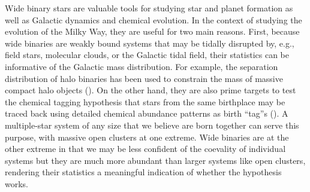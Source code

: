 \documentclass[modern, letterpaper]{aastex61}
\begin{document}
Wide binary stars are valuable tools for studying star and planet formation as well
as Galactic dynamics and chemical evolution.
In the context of studying the evolution of the Milky Way, they are useful for
two main reasons.
First, because wide binaries are weakly bound systems that may be tidally
disrupted by, e.g., field stars, molecular clouds, or the Galactic tidal field,
their statistics can be informative of the Galactic mass distribution.
For example, the separation distribution of halo binaries has been used to
constrain the mass of massive compact halo objects (\citealt{Yoo:2004aa}).
On the other hand, they are also prime targets to test the chemical tagging
hypothesis that stars from the same birthplace may be traced back using detailed
chemical abundance patterns as birth ``tag''s (\citealt{2002ARA&A..40..487F}).
A multiple-star system of any size that we believe are born together can serve
this purpose, with massive open clusters at one extreme.
Wide binaries are at the other extreme in that we may be less confident of the
coevality of individual systems but they are much more abundant than larger
systems like open clusters, rendering their statistics a meaningful indication
of whether the hypothesis works.
\end{document}

